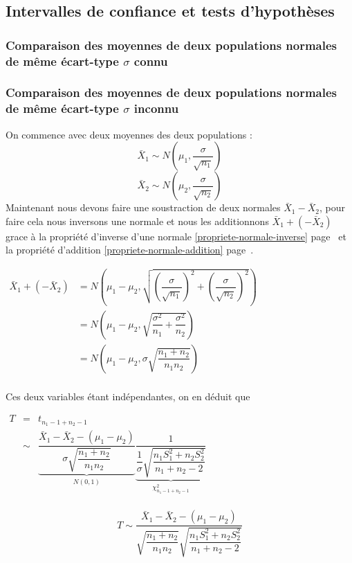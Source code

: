 \newpage
\subsection{Intervalles de confiance et tests d'hypothèses}
\subsubsection{Comparaison des moyennes de deux populations normales de même écart-type $\sigma$ connu}












\newpage
\subsubsection{Comparaison des moyennes de deux populations normales de même écart-type $\sigma$ inconnu}
On commence avec deux moyennes des deux populations :
$$\bar{X}_1 \sim N \left( \mu_1, \dfrac{\sigma}{\sqrt{n_1}} \right)$$
$$\bar{X}_2 \sim N \left( \mu_2, \dfrac{\sigma}{\sqrt{n_2}} \right)$$
Maintenant nous devons faire une soustraction de deux normales $\bar{X}_1 - \bar{X}_2$, pour faire cela nous inversons une normale et nous les additionnons $\bar{X}_1 + (-\bar{X}_2)$ grace à la propriété d'inverse d'une normale \ref{propriete-normale-inverse} page~\pageref{propriete-normale-inverse} et la propriété d'addition \ref{propriete-normale-addition} page~\pageref{propriete-normale-addition}.
\begin{center}
$\begin{array}{LL}
\bar{X}_1 + (-\bar{X}_2) &= N \left( \mu_1 - \mu_2, \sqrt{\left(\dfrac{\sigma}{\sqrt{n_1}}\right)^2 + \left(\dfrac{\sigma}{\sqrt{n_2}}\right)^2} \right)\\
                      &= N \left( \mu_1 - \mu_2, \sqrt{\dfrac{\sigma^2}{n_1} + \dfrac{\sigma^2}{n_2}} \right)\\
                      &= N \left( \mu_1 - \mu_2, \sigma\sqrt{\dfrac{n_1 + n_2}{n_1 n_2}} \right)\\
\end{array}$
\end{center}
Ces deux variables étant indépendantes, on en déduit que
\begin{center}
$\begin{array}{LCL}
T &=& t_{n_1-1+n_2-1}\\
&\sim& \underbrace{\dfrac{\bar{X}_1 - \bar{X}_2 - (\mu_1 - \mu_2)}{\sigma\sqrt{\dfrac{n_1+n_2}{n_1n_2}}}}_{\displaystyle N(0,1)} \underbrace{\dfrac{1}{\dfrac{1}{\sigma}\sqrt{\dfrac{n_1S^2_1+n_2S_2^2}{n_1+n_2-2}}}}_{\displaystyle\chi_{n_1-1+n_2-1}^2}\\
\end{array}$
\end{center}
$$\boxed{T \sim \dfrac{\bar{X}_1 - \bar{X}_2 - (\mu_1 - \mu_2)}{\sqrt{\dfrac{n_1+n_2}{n_1n_2}}\sqrt{\dfrac{n_1S^2_1+n_2S_2^2}{n_1+n_2-2}}}}$$